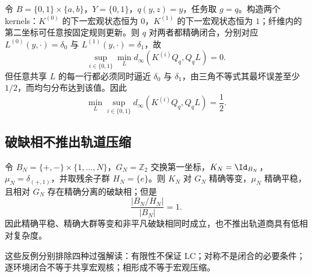 \begin{counterexample}[逐环境规律不等于共享规律]
令 $B=\{0,1\}\times\{a,b\}$，$Y=\{0,1\}$，$q(y,z)=y$，任务取 $g=q$。构造两个 kernels：$K^{(0)}$ 的下一宏观状态恒为 $0$，$K^{(1)}$ 的下一宏观状态恒为 $1$；纤维内的第二坐标可任意按固定规则更新。则 $q$ 对两者都精确闭合，分别对应
$L^{(0)}(y,\cdot)=\delta_0$ 与 $L^{(1)}(y,\cdot)=\delta_1$，故
\[
\sup_{i\in\{0,1\}}\min_L
d_\infty(K^{(i)}Q_q,Q_qL)=0.
\]
但任意共享 $L$ 的每一行都必须同时逼近 $\delta_0$ 与 $\delta_1$，由三角不等式其最坏误差至少 $1/2$，而均匀分布达到该值。因此
\[
\min_L\sup_{i\in\{0,1\}}
d_\infty(K^{(i)}Q_q,Q_qL)=\frac12.
\]
\end{counterexample}

\subsection{破缺相不推出轨道压缩}

\begin{counterexample}[相形成与低复杂度分离]
令 $B_N=\{+,-\}\times\{1,\ldots,N\}$，$G_N=\mathbb Z_2$ 交换第一坐标，$K_N=\Id_{B_N}$，$\mu_N=\delta_{(+,1)}$，并取残余子群 $H_N=\{e\}$。则 $K_N$ 对 $G_N$ 精确等变，$\mu_N$ 精确平稳，且相对 $G_N$ 存在精确分离的破缺相；但是
\[
\frac{|B_N/H_N|}{|B_N|}=1.
\]
因此精确平稳、精确大群等变和非平凡破缺相同时成立，也不推出轨道商具有低相对复杂度。
\end{counterexample}

这些反例分别排除四种过强解读：有限性不保证 LC；对称不是闭合的必要条件；逐环境闭合不等于共享宏观核；相形成不等于宏观压缩。
